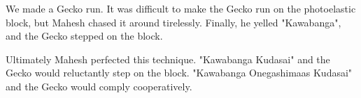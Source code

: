 We made a Gecko run. It was difficult to make the Gecko run on the photoelastic block, but Mahesh chased it around tirelessly. Finally, he yelled "Kawabanga", and the Gecko stepped on the block.

Ultimately Mahesh perfected this technique. "Kawabanga Kudasai" and the Gecko would reluctantly step on the block. "Kawabanga Onegashimaas Kudasai" and the Gecko would comply cooperatively.
